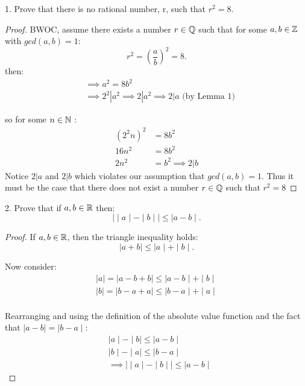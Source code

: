 

1. Prove that there is no rational number, r, such that $r^{2} = 8$.

\begin{proof}

	BWOC, assume there exists a number $r \in \mathbb{Q}$ such that for some $a, b \in \mathbb{Z}$ with $gcd\left( a, b \right) = 1$:
	\[
		r^{2} = \left(\frac{a}{b}\right)^{2} = 8
	.\] 
	then:
	\begin{align}
		&\implies a^{2} = 8b^{2}\\ 
		&\implies 2^{2}|a^{2} \implies 2|a^{2} \implies 2|a \text{ (by Lemma 1)}
	\end{align}

	so for some $n \in \mathbb{N}$ :
	\begin{align}
		\left( 2^{2}n \right)^{2} &= 8b^{2}\\
		16n^{2}                   &= 8b^{2}\\
		2n^{2}  		  &= b^{2} \implies 2|b
	\end{align}
	Notice $2|a$ and $2|b$ which violates our assumption that $gcd\left( a,b \right) = 1$. Thus it must be the case that there does not exist a number $r \in \mathbb{Q}$ such that $r^{2} = 8$

\end{proof}


2. Prove that if $a,b \in  \mathbb{R}$ then:
\[
	 \mid  \mid a \mid  -  \mid b  \mid  \mid \leq  \mid a - b  \mid  
.\] 

\begin{proof}
	If $a, b \in \mathbb{R}$, then the triangle inequality holds:
	\[
		 \mid a + b  \mid  \le  \mid a  \mid +  \mid b \mid 	
	.\]

	Now consider:
	\begin{align}
		 \mid a \mid =  \mid a - b + b  \mid \le  \mid a-b \mid +  \mid b \mid \\
		 \mid b \mid =  \mid b - a + a  \mid \le  \mid b-a \mid +  \mid a \mid \\ 
	\end{align}

	Rearranging and using the definition of the absolute value function and the fact that $ \mid a-b \mid =  \mid b-a \mid $:
	\begin{align}
		 &\mid a \mid -  \mid b \mid  \le  \mid a-b \mid \\
		 &\mid b \mid -  \mid a  \mid \le    \mid b-a \mid \\ 	
		 &\implies  \mid  \mid a \mid - \mid b \mid  \mid \le  \mid a-b \mid  
	\end{align}
\end{proof}


